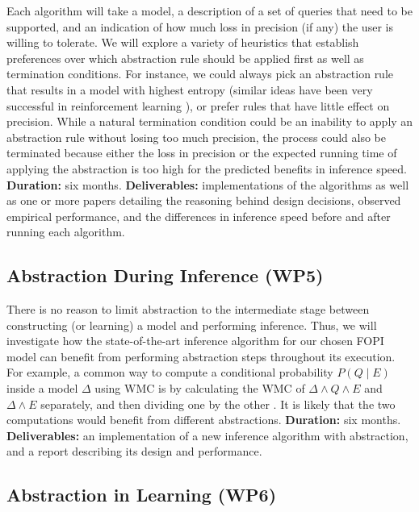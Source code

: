 \documentclass{article}
\begin{document}
Each algorithm will take a model, a description of a set of queries that need to
be supported, and an indication of how much loss in precision (if any) the user
is willing to tolerate. We will explore a variety of heuristics that establish
preferences over which abstraction rule should be applied first as well as
termination conditions. For instance, we could always pick an abstraction rule
that results in a model with highest entropy (similar ideas have been very
successful in reinforcement learning \cite{DBLP:conf/aaai/ZiebartMBD08}), or
prefer rules that have little effect on precision. While a natural termination
condition could be an inability to apply an abstraction rule without losing too
much precision, the process could also be terminated because either the loss in
precision or the expected running time of applying the abstraction is too high
for the predicted benefits in inference speed. \textbf{Duration:} six months.
\textbf{Deliverables:} implementations of the algorithms as well as one or more
papers detailing the reasoning behind design decisions, observed empirical
performance, and the differences in inference speed before and after running
each algorithm.

\subsection{Abstraction During Inference (WP5)}

There is no reason to limit abstraction to the intermediate stage between
constructing (or learning) a model and performing inference. Thus, we will
investigate how the state-of-the-art inference algorithm for our chosen FOPI
model can benefit from performing abstraction steps throughout its execution.
For example, a common way to compute a conditional probability $P(Q \mid E)$
inside a model $\Delta$ using WMC is by calculating the WMC of $\Delta \land Q
\land E$ and $\Delta \land E$ separately, and then dividing one by the other
\cite{DBLP:journals/ai/ChaviraD08}. It is likely that the two computations would
benefit from different abstractions. \textbf{Duration:} six months.
\textbf{Deliverables:} an implementation of a new inference algorithm with
abstraction, and a report describing its design and performance.

\subsection{Abstraction in Learning (WP6)}
\end{document}
